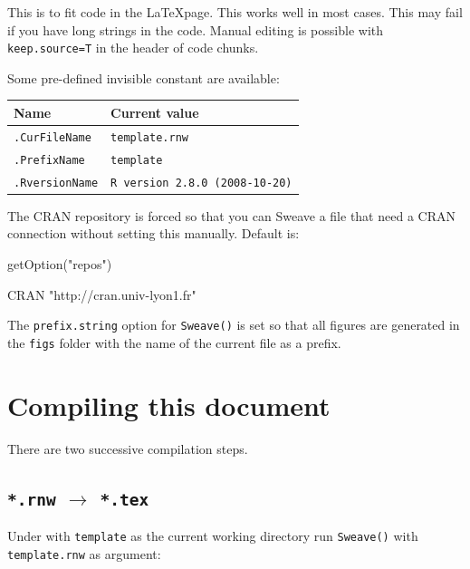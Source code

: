 \documentclass{article}
\begin{document}
This is to fit \Rlogo{} code in the \LaTeX page. This works well
in most cases. This may fail if you have long strings in the code.
Manual editing is possible with \texttt{keep.source=T} in the header
of code chunks.

\vspace{0.2cm}
Some pre-defined invisible \Rlogo{} constant are available:

\begin{tabular}{ll}
\hline \hline
Name & Current value\\
\hline
\texttt{.CurFileName} & \texttt{template.rnw}\\
\texttt{.PrefixName} & \texttt{template}\\
\texttt{.RversionName} & \texttt{R version 2.8.0 (2008-10-20)}\\
\hline \hline
\end{tabular}
\vspace{0.2cm}

The CRAN repository is forced so that you can Sweave a file that
need a CRAN connection without setting this manually. Default
is:

\begin{Schunk}
\begin{Sinput}
 getOption("repos")
\end{Sinput}
\begin{Soutput}
                       CRAN 
"http://cran.univ-lyon1.fr" 
\end{Soutput}
\end{Schunk}

\vspace{0.2cm}
The \texttt{prefix.string} option for \texttt{Sweave()} is set
so that all figures are generated in the \texttt{figs} folder with
the name of the current file as a prefix.

\section{Compiling this document}

There are two successive compilation steps.

\subsection{\texttt{*.rnw} $\rightarrow$ \texttt{*.tex}}

Under \Rlogo{} with \texttt{template} as the current working directory
run \texttt{Sweave()} with \texttt{template.rnw} as argument:
\end{document}
